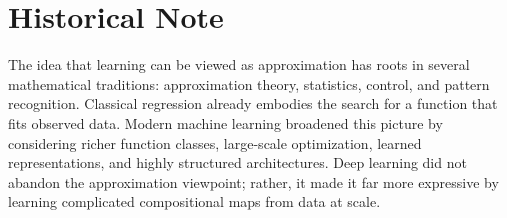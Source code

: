 \section*{Historical Note}

The idea that learning can be viewed as approximation has roots in several mathematical traditions: approximation theory, statistics, control, and pattern recognition. Classical regression already embodies the search for a function that fits observed data. Modern machine learning broadened this picture by considering richer function classes, large-scale optimization, learned representations, and highly structured architectures. Deep learning did not abandon the approximation viewpoint; rather, it made it far more expressive by learning complicated compositional maps from data at scale.